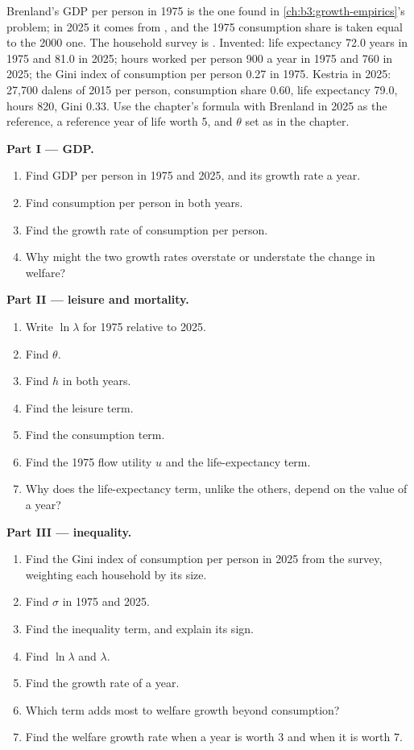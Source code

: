 \begin{problem}\label{pb:b3:income-and-wellbeing-evidence:brenland}
Brenland's GDP per person in 1975 is the one found in \cref{ch:b3:growth-empirics}'s problem; in 2025 it comes
from , and the 1975 consumption share is taken equal to the 2000 one. The household
survey is . Invented: life expectancy 72.0 years in 1975 and 81.0 in 2025;
hours worked per person 900 a year in 1975 and 760 in 2025; the Gini index of consumption per person 0.27 in
1975. Kestria in 2025: 27{,}700 dalens of 2015 per person, consumption share 0.60, life expectancy 79.0, hours 820, Gini
0.33. Use the chapter's formula with Brenland in 2025 as the reference, a reference year of life worth 5, and
$\theta$ set as in the chapter. %

\medskip\noindent\textbf{Part I --- GDP.}
\begin{enumerate}
\item Find GDP per person in 1975 and 2025, and its growth rate a year.
\item Find consumption per person in both years.
\item Find the growth rate of consumption per person.
\item Why might the two growth rates overstate or understate the change in welfare?
\end{enumerate}

\medskip\noindent\textbf{Part II --- leisure and mortality.}
\begin{enumerate}[resume]
\item Write $\ln\lambda$ for 1975 relative to 2025.
\item Find $\theta$.
\item Find $h$ in both years.
\item Find the leisure term.
\item Find the consumption term.
\item Find the 1975 flow utility $u$ and the life-expectancy term.
\item Why does the life-expectancy term, unlike the others, depend on the value of a year?
\end{enumerate}

\medskip\noindent\textbf{Part III --- inequality.}
\begin{enumerate}[resume]
\item Find the Gini index of consumption per person in 2025 from the survey, weighting each household by
its size.
\item Find $\sigma$ in 1975 and 2025.
\item Find the inequality term, and explain its sign.
\item Find $\ln\lambda$ and $\lambda$.
\item Find the growth rate of  a year.
\item Which term adds most to welfare growth beyond consumption?
\item Find the welfare growth rate when a year is worth 3 and when it is worth 7.
\end{enumerate}


\end{problem}
